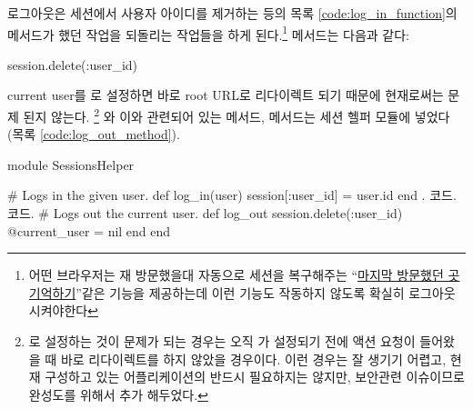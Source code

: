 로그아웃은 세션에서 사용자 아이디를 제거하는 등의 목록 \ref{code:log_in_function}의  메서드가 했던 작업을 되돌리는 작업들을 하게 된다.\footnote{ 어떤 브라우저는 재 방문했을대 자동으로 세션을 복구해주는 ``\href{http://stackoverflow.com/questions/20449641/rails-4-session-value-never-expires-or-dies-when-browser-closes을 }{마지막 방문했던 곳 기억하기}''같은 기능을 제공하는데 이런 기능도 작동하지 않도록 확실히 로그아웃 시켜야한다}  메서드는 다음과 같다: 

\begin{code} session.delete(:user_id) \end{code} 

\noindent current user를 로 설정하면 바로 root URL로 리다이렉트 되기 때문에 현재로써는 문제 된지 않는다. \footnote{  로 설정하는 것이 문제가 되는 경우는 오직  가 설정되기 전에  액션 요청이 들어왔을 때 바로 리다이렉트를 하지 않았을 경우이다. 이런 경우는 잘 생기기 어렵고, 현재 구성하고 있는 어플리케이션의 반드시 필요하지는 않지만, 보안관련 이슈이므로 완성도를 위해서 추가 해두었다.} 와 이와 관련되어 있는 메서드,  메서드는 세션 헬퍼 모듈에 넣었다(목록 \ref{code:log_out_method}). 

\begin{codelisting} \label{code:log_out_method}  

\begin{code} module SessionsHelper 

# Logs in the given user. def log_in(user) session[:user_id] = user.id end . 코드. 코드. # Logs out the current user. def log_out session.delete(:user_id) @current_user = nil end end \end{code} \end{codelisting} 

